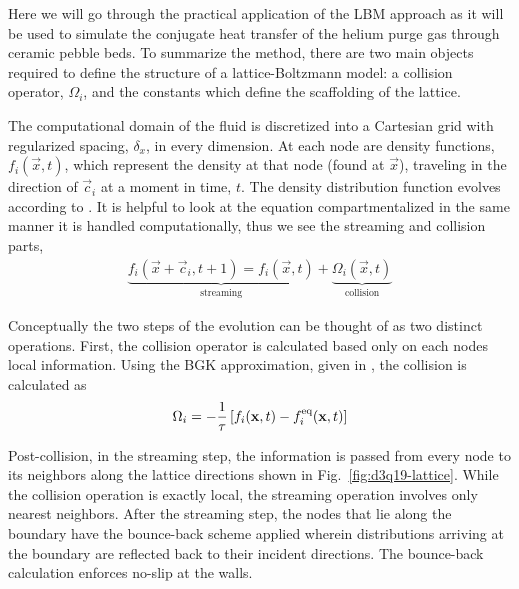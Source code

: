 Here we will go through the practical application of the LBM approach as it will be used  to simulate the conjugate heat transfer of the helium purge gas through ceramic pebble beds. To summarize the method, there are two main objects required to define the structure of a lattice-Boltzmann model: a collision operator, $\Omega_i$, and the constants which define the scaffolding of the lattice.

The computational domain of the fluid is discretized into a Cartesian grid with regularized spacing, $\delta_x$, in every dimension. At each node are density functions, $f_i(\vec{x},t)$, which represent the density at that node (found at $\vec{x}$), traveling in the direction of $\vec{c}_i$ at a moment in time, $t$. The density distribution function evolves according to . It is helpful to look at the equation compartmentalized in the same manner it is handled computationally, thus we see the streaming and collision parts,
\begin{align}
	\underbrace{f_i(\vec{x}+\vec{c}_i, t + 1)  = f_i(\vec{x},t)}_\text{streaming}  + \underbrace{\Omega_i(\vec{x},t)}_\text{collision}
\end{align}

Conceptually the two steps of the evolution can be thought of as two distinct operations. First, the collision operator is calculated based only on each nodes local information. Using the BGK approximation, given in , the collision is calculated as
\begin{align}
	\Omega_i = -\frac{1}{\tau}\left[f_i(\mathbf{x},t) - f_i^{\text{eq}}(\mathbf{x},t)\right]
\end{align}

Post-collision, in the streaming step, the information is passed from every node to its neighbors along the lattice directions shown in Fig.~\ref{fig:d3q19-lattice}. While the collision operation is exactly local, the streaming operation involves only nearest neighbors. After the streaming step, the nodes that lie along the boundary have the bounce-back scheme applied wherein distributions arriving at the boundary are reflected back to their incident directions. The bounce-back calculation enforces no-slip at the walls.

